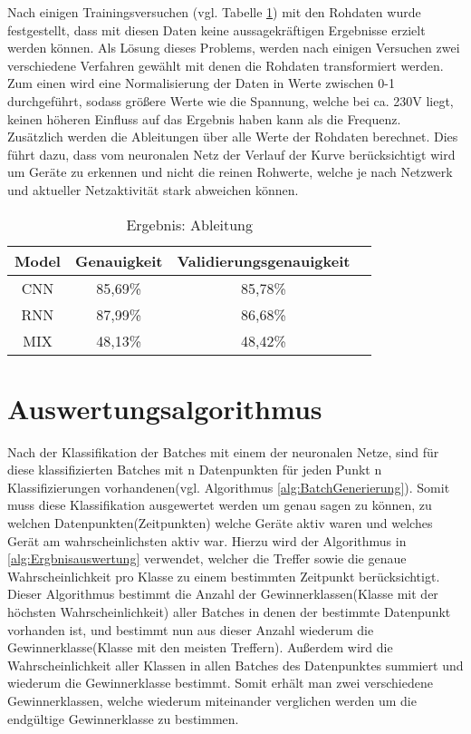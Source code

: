     \noindent
    Nach einigen Trainingsversuchen (vgl. Tabelle \ref{tabl:ErgebnisAbleitung}) mit den Rohdaten wurde festgestellt, dass mit diesen Daten keine aussagekräftigen Ergebnisse erzielt werden können.
    Als Lösung dieses Problems, werden nach einigen Versuchen zwei verschiedene Verfahren gewählt mit denen die Rohdaten transformiert werden. \\
    \noindent
    Zum einen wird eine Normalisierung der Daten in Werte zwischen 0-1 durchgeführt, sodass größere Werte wie die Spannung, welche bei ca. 230V liegt, keinen höheren Einfluss auf das Ergebnis haben kann als die Frequenz.\\
    \noindent
    Zusätzlich werden die Ableitungen über alle Werte der Rohdaten berechnet.
    Dies führt dazu, dass vom neuronalen Netz der Verlauf der Kurve berücksichtigt wird um Geräte zu erkennen und nicht die reinen Rohwerte, welche je nach Netzwerk und aktueller Netzaktivität stark abweichen können.

    \begin{table}[H]
        \centering
        \begin{tabular}{|c|c|c|c|}
            \hline
            Model & Genauigkeit & Validierungsgenauigkeit \\
            \hline
            CNN & 85,69\% & 85,78\% \\
            \hline
            RNN & 87,99\% & 86,68\% \\
            \hline
            MIX & 48,13\% & 48,42\% \\
            \hline
        \end{tabular}
        \caption{Ergebnis: Ableitung}
        \label{tabl:ErgebnisAbleitung}
    \end{table}

    \section{Auswertungsalgorithmus}\label{Auswertungsalgorithmus}
        Nach der Klassifikation der Batches mit einem der neuronalen Netze, sind für diese klassifizierten Batches mit n Datenpunkten für jeden Punkt n Klassifizierungen vorhandenen(vgl. Algorithmus \ref{alg:BatchGenerierung}).
        Somit muss diese Klassifikation ausgewertet werden um genau sagen zu können, zu welchen Datenpunkten(Zeitpunkten) welche Geräte aktiv waren und welches Gerät am wahrscheinlichsten aktiv war.
        Hierzu wird der Algorithmus in \ref{alg:Ergbnisauswertung} verwendet, welcher die Treffer sowie die genaue Wahrscheinlichkeit pro Klasse zu einem bestimmten Zeitpunkt berücksichtigt. 
        Dieser Algorithmus bestimmt die Anzahl der Gewinnerklassen(Klasse mit der höchsten Wahrscheinlichkeit) aller Batches in denen der bestimmte Datenpunkt vorhanden ist, und bestimmt nun aus dieser Anzahl wiederum die Gewinnerklasse(Klasse mit den meisten Treffern).
        Außerdem wird die Wahrscheinlichkeit aller Klassen in allen Batches des Datenpunktes summiert und wiederum die Gewinnerklasse bestimmt.
        Somit erhält man zwei verschiedene Gewinnerklassen, welche wiederum miteinander verglichen werden um die endgültige Gewinnerklasse zu bestimmen.

